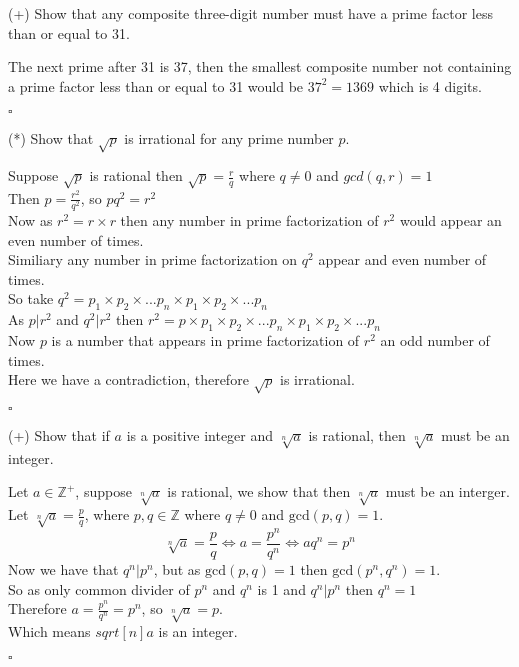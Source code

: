 \documentclass{exam}
\begin{document}
\begin{questions}
    \question (+) Show that any composite three-digit number must have a prime factor less than or equal to 31.
    \begin{solution}
        The next prime after 31 is 37, then the smallest composite number not containing a prime factor less than or equal to 31 would be $37^2 = 1369$ which is 4 digits.
        \begin{flushright}
            $\square$
        \end{flushright}
    \end{solution}

    \question (*) Show that $\sqrt{p}$ is irrational for any prime number $p$.
    \begin{solution}
        Suppose $\sqrt{p}$ is rational then $\sqrt{p} = \frac{r}{q}$ where $q \neq 0$ and $gcd(q,r) = 1$
        \\Then $p = \frac{r^2}{q^2}$, so $pq^2 = r^2$
        \\Now as $r^2 = r \times r$ then any number in prime factorization of $r^2$ would appear an even number of times. 
        \\Similiary any number in prime factorization on $q^2$ appear and even number of times.
        \\So take $q^2 = p_1 \times p_2 \times... p_n \times p_1 \times p_2 \times... p_n$
        \\As $p|r^2$ and $q^2|r^2$ then $r^2 = p \times p_1 \times p_2 \times... p_n \times p_1 \times p_2 \times... p_n$
        \\Now $p$ is a number that appears in prime factorization of $r^2$ an odd number of times.
        \\Here we have a contradiction, therefore $\sqrt{p}$ is irrational.
        \begin{flushright}
            $\square$
        \end{flushright}
    \end{solution}
    
    \question (+) Show that if $a$ is a positive integer and $\sqrt[n]{a}$ is rational, then $\sqrt[n]{a}$ must be an integer.
    \begin{solution}
        Let $a \in \mathbb{Z}^+$, suppose $\sqrt[n]{a}$ is rational, we show that then $\sqrt[n]{a}$ must be an interger.
        \\Let $\sqrt[n]{a} = \frac{p}{q}$, where $p,q \in \mathbb{Z}$ where $q \neq 0$ and $\text{gcd}(p,q) = 1$.
        $$\sqrt[n]{a} = \frac{p}{q} \Leftrightarrow a = \frac{p^n}{q^n} \Leftrightarrow a q^n = p^n$$
        Now we have that $q^n | p^n$, but as $\text{gcd}(p,q) = 1$ then $\text{gcd}(p^n,q^n) = 1$.
        \\So as only common divider of $p^n$ and $q^n$ is 1 and $q^n | p^n$ then $q^n = 1$
        \\Therefore $ a = \frac{p^n}{q^n} = p^n$, so $\sqrt[n]{a} = p$.
        \\Which means $sqrt[n]{a}$ is an integer.
        \begin{flushright}
            $\square$
        \end{flushright}
    \end{solution}
    

\end{questions}
\end{document}
